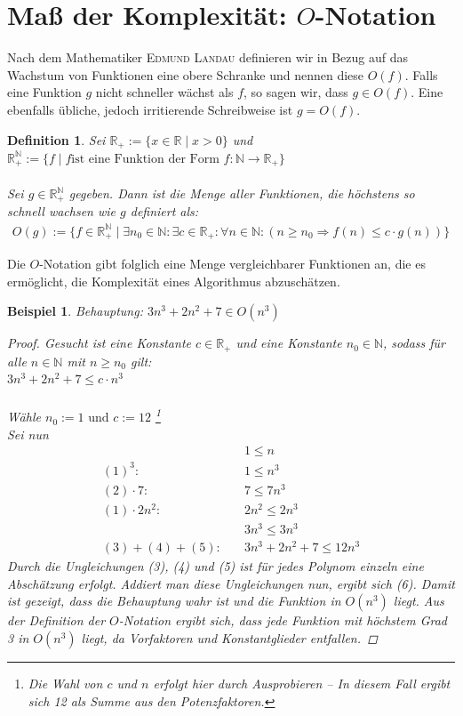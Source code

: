 \documentclass[11pt,a4paper]{scrartcl}
\newtheorem{definition}{Definition}
\newtheorem{example}{Beispiel}
\begin{document}
\section{Maß der Komplexität: $O$-Notation}
Nach dem Mathematiker \textsc{Edmund Landau} definieren wir in Bezug auf das Wachstum von Funktionen eine {\glqq}obere Schranke{\grqq} und nennen diese $O(f)$. Falls eine Funktion $g$ nicht schneller wächst als $f$, so sagen wir, dass $g \in O(f)$. Eine ebenfalls übliche, jedoch irritierende Schreibweise ist $g = O(f)$.
\begin{definition}
Sei $\mathbb{R_{+}} := \{ x \in \mathbb{R} \mid x > 0 \}$ und $\mathbb{R_{+}^{\mathbb{N}}} := \{f \mid f \text{ist eine Funktion der Form } f : \mathbb{N} \to \mathbb{R_{+}}\}$ \\\\
Sei $g \in \mathbb{R_{+}^{\mathbb{N}}}$ gegeben. Dann ist die Menge aller Funktionen, die höchstens so schnell wachsen wie $g$ definiert als: \begin{align*}
O(g) := \{f \in \mathbb{R_{+}^{\mathbb{N}}} \mid \exists n_{0} \in \mathbb{N}: \exists c \in \mathbb{R_{+}}: \forall n \in \mathbb{N}: (n \geq n_{0} \Rightarrow f(n) \leq c \cdot g(n))\}
\end{align*}
\end{definition}
Die $O$-Notation gibt folglich eine Menge vergleichbarer Funktionen an, die es ermöglicht, die Komplexität eines Algorithmus abzuschätzen.
\begin{example}
Behauptung:
$3n^{3} + 2n^{2} + 7 \in O(n^{3})$
\begin{proof}

Gesucht ist eine Konstante $c \in \mathbb{R_{+}}$ und eine Konstante $n_{0} \in \mathbb{N}$, sodass für alle $n \in \mathbb{N}$ mit $n \geq n_{0}$ gilt: \\
$3n^{3} + 2n^{2} + 7 \leq c \cdot n^{3}$ \\\\
Wähle $n_{0} := 1 \text{ und } c := 12$ \footnote{Die Wahl von $c$ und $n$ erfolgt hier durch Ausprobieren -- In diesem Fall ergibt sich 12 als Summe aus den Potenzfaktoren.} \\
Sei nun 
\begin{align}
& 1 \leq n \\
(1)^{3}: \quad & 1 \leq n^{3} \\
(2) \cdot 7: \quad & 7 \leq 7n^{3} \\
(1) \cdot 2n^{2}: \quad & 2n^{2} \leq 2n^{3} \\
\quad & 3n^{3} \leq 3n^{3} \\
(3)+(4)+(5): \quad & 3n^{3} + 2n^{2} + 7 \leq 12n^{3}
\end{align}
Durch die Ungleichungen (3), (4) und (5) ist für jedes Polynom einzeln eine Abschätzung erfolgt. Addiert man diese Ungleichungen nun, ergibt sich (6). Damit ist gezeigt, dass die Behauptung wahr ist und die Funktion in $O(n^{3})$ liegt. Aus der Definition der $O$-Notation ergibt sich, dass jede Funktion mit höchstem Grad 3 in $O(n^{3})$ liegt, da Vorfaktoren und Konstantglieder entfallen. 
\end{proof}
\end{example} 
\end{document}
